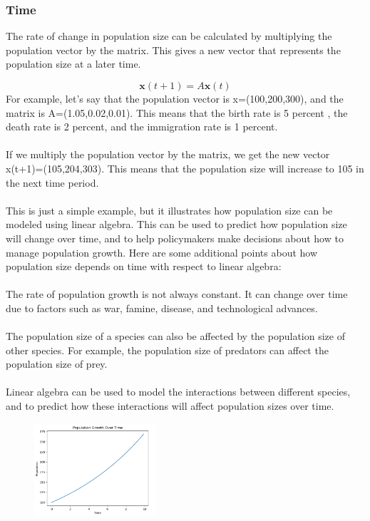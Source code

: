 \documentclass[12pt]{article}
\begin{document}
\subsubsection{Time}
The rate of change in population size can be calculated by multiplying the population vector by the matrix. This gives a new vector that represents the population size at a later time.

\begin{equation}
\mathbf{x}(t + 1) = A \mathbf{x}(t)
\end{equation}
For example, let's say that the population vector is x=(100,200,300), and the matrix is A=(1.05,0.02,0.01). This means that the birth rate is 5 percent , the death rate is 2 percent, and the immigration rate is 1 percent.\\\\
If we multiply the population vector by the matrix, we get the new vector x(t+1)=(105,204,303). This means that the population size will increase to 105 in the next time period.\\\\
This is just a simple example, but it illustrates how population size can be modeled using linear algebra. This can be used to predict how population size will change over time, and to help policymakers make decisions about how to manage population growth.
Here are some additional points about how population size depends on time with respect to linear algebra:\\\\
The rate of population growth is not always constant. It can change over time due to factors such as war, famine, disease, and technological advances.\\\\
The population size of a species can also be affected by the population size of other species. For example, the population size of predators can affect the population size of prey.\\\\
Linear algebra can be used to model the interactions between different species, and to predict how these interactions will affect population sizes over time.
\begin{figure}[H]
  \centering
  \includegraphics[width=0.4\textwidth]{timefianl.png}
\end{figure}
\end{document}
